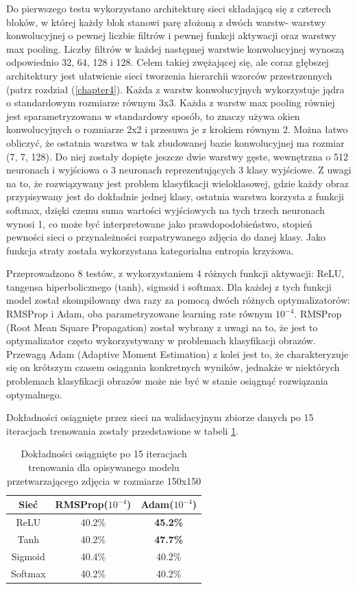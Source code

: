 Do pierwszego testu wykorzystano architekturę sieci składającą się z czterech bloków, w której każdy blok stanowi parę złożoną z dwóch warstw- warstwy konwolucyjnej o pewnej liczbie filtrów i pewnej funkcji aktywacji oraz warstwy max pooling. Liczby filtrów w każdej następnej warstwie konwolucyjnej wynoszą odpowiednio 32, 64, 128 i 128. Celem takiej zwężającej się, ale coraz głębszej architektury jest ułatwienie sieci tworzenia hierarchii wzorców przestrzennych (patrz rozdział (\ref{chapter4}). Każda z warstw konwolucyjnych wykorzystuje jądra o standardowym rozmiarze równym 3x3. Każda z warstw max pooling równiej jest sparametryzowana w standardowy sposób, to znaczy używa okien konwolucyjnych o rozmiarze 2x2 i przesuwa je z krokiem równym 2. Można łatwo obliczyć, że ostatnia warstwa w tak zbudowanej bazie konwolucyjnej ma rozmiar (7, 7, 128). Do niej zostały dopięte jeszcze dwie warstwy gęste, wewnętrzna o 512 neuronach i wyjściowa o 3 neuronach reprezentujących 3 klasy wyjściowe. Z uwagi na to, że rozwiązywany jest problem klasyfikacji wieloklasowej, gdzie każdy obraz przypisywany jest do dokładnie jednej klasy, ostatnia warstwa korzysta z funkcji softmax, dzięki czemu suma wartości wyjściowych na tych trzech neuronach wynosi 1, co może być interpretowane jako prawdopodobieństwo, stopień pewności sieci o przynależności rozpatrywanego zdjęcia do danej klasy. Jako funkcja straty została wykorzystana kategorialna entropia krzyżowa.

Przeprowadzono 8 testów, z wykorzystaniem 4 różnych funkcji aktywacji: ReLU, tangensa hiperbolicznego (tanh), sigmoid i softmax. Dla każdej z tych funkcji model został skompilowany dwa razy za pomocą dwóch różnych optymalizatorów: RMSProp i Adam, oba parametryzowane learning rate równym $10^{-4}$. RMSProp (Root Mean Square Propagation) został wybrany z uwagi na to, że jest to optymalizator często wykorzystywany w problemach klasyfikacji obrazów. Przewagą Adam (Adaptive Moment Estimation) z kolei jest to, że charakteryzuje się on krótszym czasem osiągania konkretnych wyników, jednakże w niektórych problemach klasyfikacji obrazów może nie być w stanie osiągnąć rozwiązania optymalnego.

Dokładności osiągnięte przez sieci na walidacyjnym zbiorze danych po 15 iteracjach trenowania zostały przedstawione w tabeli \ref{tab:5.1}.

\begin{table}[H]
  \caption{Dokładności osiągnięte po 15 iteracjach trenowania dla opisywanego modelu przetwarzającego zdjęcia w rozmiarze 150x150}
    \centering
    \begin{tabular}{ |c|c|c| }
    \hline
    Sieć & RMSProp($10^{-4}$) & Adam($10^{-4}$) \\
    \hline
    ReLU & 40.2\% & \textbf{45.2\%} \\
    Tanh & 40.2\% & \textbf{47.7\%} \\
    Sigmoid & 40.4\% & 40.2\% \\
    Softmax & 40.2\% & 40.2\% \\
    \hline
    \end{tabular}
  \label{tab:5.1}
\end{table}

